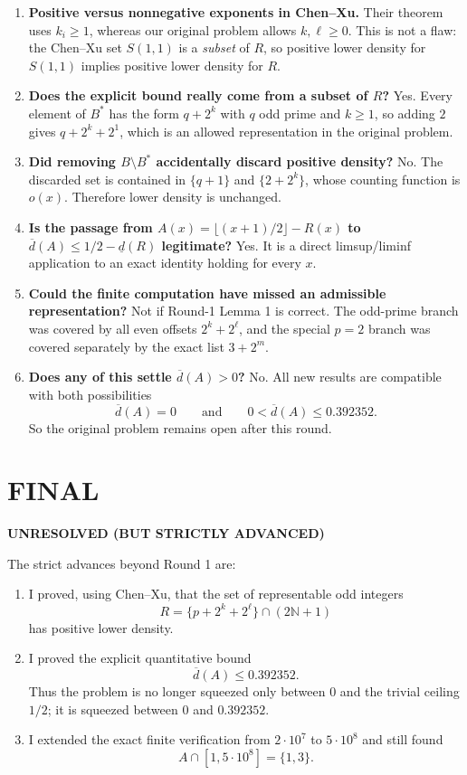 \begin{enumerate}
\item \textbf{Positive versus nonnegative exponents in Chen--Xu.} Their theorem uses $k_i\ge 1$, whereas our original problem allows $k,\ell\ge 0$. This is not a flaw: the Chen--Xu set $S(1,1)$ is a \emph{subset} of $R$, so positive lower density for $S(1,1)$ implies positive lower density for $R$.

\item \textbf{Does the explicit bound really come from a subset of $R$?} Yes. Every element of $B^{\ast}$ has the form $q+2^k$ with $q$ odd prime and $k\ge 1$, so adding $2$ gives $q+2^k+2^1$, which is an allowed representation in the original problem.

\item \textbf{Did removing $B\setminus B^{\ast}$ accidentally discard positive density?} No. The discarded set is contained in $\{q+1\}$ and $\{2+2^k\}$, whose counting function is $o(x)$. Therefore lower density is unchanged.

\item \textbf{Is the passage from $A(x)=\lfloor(x+1)/2\rfloor-R(x)$ to $\overline d(A)\le 1/2-\underline d(R)$ legitimate?} Yes. It is a direct limsup/liminf application to an exact identity holding for every $x$.

\item \textbf{Could the finite computation have missed an admissible representation?} Not if Round-1 Lemma 1 is correct. The odd-prime branch was covered by all even offsets $2^k+2^\ell$, and the special $p=2$ branch was covered separately by the exact list $3+2^m$.

\item \textbf{Does any of this settle $\overline d(A)>0$?} No. All new results are compatible with both possibilities
\[
\overline d(A)=0
\qquad\text{and}\qquad
0<\overline d(A)\le 0.392352.
\]
So the original problem remains open after this round.
\end{enumerate}

\section{FINAL}

\textbf{UNRESOLVED (BUT STRICTLY ADVANCED)}

The strict advances beyond Round 1 are:

\begin{enumerate}
\item I proved, using Chen--Xu, that the set of representable odd integers
\[
R=\{p+2^k+2^\ell\}\cap(2\mathbb N+1)
\]
has positive lower density.

\item I proved the explicit quantitative bound
\[
\overline d(A)\le 0.392352.
\]
Thus the problem is no longer squeezed only between $0$ and the trivial ceiling $1/2$; it is squeezed between $0$ and $0.392352$.

\item I extended the exact finite verification from $2\cdot 10^7$ to $5\cdot 10^8$ and still found
\[
A\cap[1,5\cdot 10^8]=\{1,3\}.
\]
\end{enumerate}


